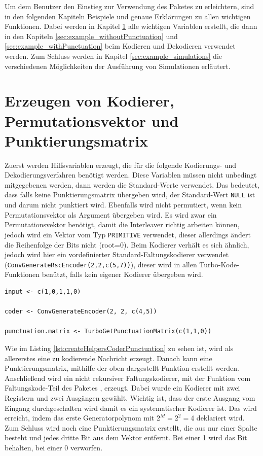 Um dem Benutzer den Einstieg zur Verwendung des Paketes zu erleichtern, sind in den folgenden Kapiteln Beispiele und genaue Erklärungen zu allen wichtigen Funktionen. Dabei werden in Kapitel \ref{sec:example_createHelpers} alle wichtigen Variablen erstellt, die dann in den Kapiteln \ref{sec:example_withoutPunctuation} und \ref{sec:example_withPunctuation} beim Kodieren und Dekodieren verwendet werden. Zum Schluss werden in Kapitel \ref{sec:example_simulations} die verschiedenen Möglichkeiten der Ausführung von Simulationen erläutert.

\section{Erzeugen von Kodierer, Permutationsvektor und Punktierungsmatrix}
\label{sec:example_createHelpers}
Zuerst werden Hilfsvariablen erzeugt, die für die folgende Kodierungs- und Dekodierungsverfahren benötigt werden. Diese Variablen müssen nicht unbedingt mitgegebenen werden, dann werden die Standard-Werte verwendet. Das bedeutet, dass falls keine Punktierungsmatrix übergeben wird, der Standard-Wert \texttt{NULL} ist und darum nicht punktiert wird. Ebenfalls wird nicht permutiert, wenn kein Permutationsvektor als Argument übergeben wird. Es wird zwar ein Permutationsvektor benötigt, damit die Interleaver richtig arbeiten können, jedoch wird ein Vektor vom Typ \texttt{PRIMITIVE} verwendet, dieser allerdings ändert die Reihenfolge der Bits nicht (root=0). Beim Kodierer verhält es sich ähnlich, jedoch wird hier ein vordefinierter Standard-Faltungskodierer verwendet (\texttt{ConvGenerateRscEncoder(2,2,c(5,7))}), dieser wird in allen Turbo-Kode-Funktionen benützt, falls kein eigener Kodierer übergeben wird.

\begin{lstlisting}[caption=Erzeugung von Kodierer und Punktierungsmatrix, label={lst:createHelpersCoderPunctuation}, float=!ht]
input <- c(1,0,1,1,0)

coder <- ConvGenerateEncoder(2, 2, c(4,5))

punctuation.matrix <- TurboGetPunctuationMatrix(c(1,1,0))
\end{lstlisting}

Wie im Listing \ref{lst:createHelpersCoderPunctuation} zu sehen ist, wird als allererstes eine zu kodierende Nachricht erzeugt. Danach kann eine Punktierungsmatrix, mithilfe der oben dargestellt Funktion erstellt werden. Anschließend wird ein nicht rekursiver Faltungskodierer, mit der Funktion vom Faltungskode-Teil des Paketes \cite{nocker}, erzeugt. Dabei wurde ein Kodierer mit zwei Registern und zwei Ausgängen gewählt. Wichtig ist, dass der erste Ausgang vom Eingang durchgeschalten wird damit es ein systematischer Kodierer ist. Das wird erreicht, indem das erste Generatorpolynom mit $2^M = 2^2 = 4$ deklariert wird. Zum Schluss wird noch eine Punktierungsmatrix erstellt, die aus nur einer Spalte besteht und jedes dritte Bit aus dem Vektor entfernt. Bei einer 1 wird das Bit behalten, bei einer 0 verworfen.

